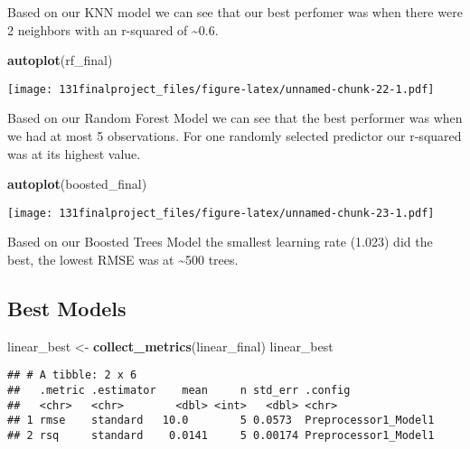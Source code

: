 \documentclass[
]{article}
\newenvironment{Shaded}{\begin{snugshade}}{\end{snugshade}}
\newcommand{\FunctionTok}[1]{\textcolor[rgb]{0.13,0.29,0.53}{\textbf{#1}}}
\newcommand{\NormalTok}[1]{#1}
\newcommand{\OtherTok}[1]{\textcolor[rgb]{0.56,0.35,0.01}{#1}}
\begin{document}
Based on our KNN model we can see that our best perfomer was when there
were 2 neighbors with an r-squared of \textasciitilde0.6.

\begin{Shaded}
\begin{Highlighting}[]
\FunctionTok{autoplot}\NormalTok{(rf\_final)}
\end{Highlighting}
\end{Shaded}

\texttt{[image: 131finalproject\_files/figure-latex/unnamed-chunk-22-1.pdf]}

Based on our Random Forest Model we can see that the best performer was
when we had at most 5 observations. For one randomly selected predictor
our r-squared was at its highest value.

\begin{Shaded}
\begin{Highlighting}[]
\FunctionTok{autoplot}\NormalTok{(boosted\_final)}
\end{Highlighting}
\end{Shaded}

\texttt{[image: 131finalproject\_files/figure-latex/unnamed-chunk-23-1.pdf]}

Based on our Boosted Trees Model the smallest learning rate (1.023) did
the best, the lowest RMSE was at \textasciitilde500 trees.

\hypertarget{best-models}{%
\subsection{\texorpdfstring{\textbf{Best
Models}}{Best Models}}\label{best-models}}

\begin{Shaded}
\begin{Highlighting}[]
\NormalTok{linear\_best }\OtherTok{\textless{}{-}} \FunctionTok{collect\_metrics}\NormalTok{(linear\_final)}
\NormalTok{linear\_best}
\end{Highlighting}
\end{Shaded}

\begin{verbatim}
## # A tibble: 2 x 6
##   .metric .estimator    mean     n std_err .config             
##   <chr>   <chr>        <dbl> <int>   <dbl> <chr>               
## 1 rmse    standard   10.0        5 0.0573  Preprocessor1_Model1
## 2 rsq     standard    0.0141     5 0.00174 Preprocessor1_Model1
\end{verbatim}
\end{document}

